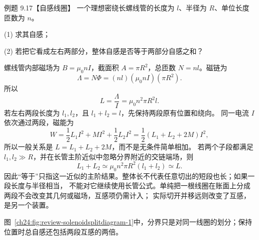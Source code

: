 \begin{origexamplebox}{例题 9.17【自感线圈】}
一个理想密绕长螺线管的长度为 $l$、半径为 $R$、单位长度匝数为 $n$。

(1) 求其自感；

(2) 若把它看成左右两部分，整体自感是否等于两部分自感之和？

%
\begin{center}\end{center}
\label{fig:em24-question-17}
\end{origexamplebox}

\begin{xesolution}
螺线管内部磁场为 $B=\mu_0nI$，截面积 $A=\pi R^2$，总匝数 $N=nl$。磁链为
\begin{equation}
  \Lambda=N\Phi=(nl)(\mu_0nI)(\pi R^2).
\end{equation}
所以
\begin{equation}
  \boxed{L=\frac\Lambda I=\mu_0n^2\pi R^2l}.
\end{equation}
若左右两段长度为 $l_1,l_2$，且 $l_1+l_2=l$，先保持两段原有位置和绕向。
同一电流 $I$ 依次通过两段，磁能为
\[
 W=\frac12L_1I^2+MI^2+\frac12L_2I^2
   =\frac12(L_1+L_2+2M)I^2,
\]
所以一般关系是 $L=L_1+L_2+2M$，而不是无条件简单相加。
若两个子段都满足 $l_1,l_2\gg R$，并在长管主阶近似中忽略分界附近的交链端场，则
\begin{equation}
  L_1+L_2\simeq\mu_0n^2\pi R^2(l_1+l_2)\simeq L.
\end{equation}
因此“等于”只指这一近似的主阶结果。整体长不代表任意切出的短段也长；如果一段长度与半径相当，
不能对它继续使用长管公式。单纯把一根线圈在账面上分成两段不会改变其几何或磁场，互感项仍需计入；
实际切开并移远则改变了互感，是另一个装置。

图~\ref{ch24:fig:review-solenoidsplitdiagram-1}中，分界只是对同一线圈的划分；保持位置时总自感还包括两段互感的两倍。
\par\noindent\begin{minipage}{\linewidth}
\solenoidSplitDiagram
{}\label{ch24:fig:review-solenoidsplitdiagram-1}
\end{minipage}\par\medskip
\end{xesolution}

